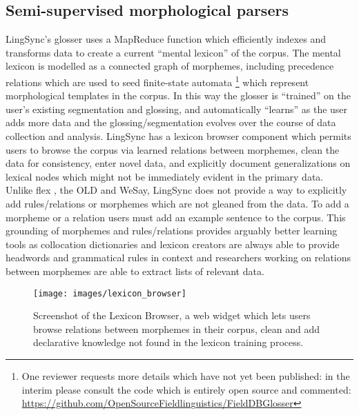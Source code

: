 \documentclass[11pt]{article}
\begin{document}
\subsection{Semi-supervised morphological parsers}
 \label{sec:lingsync-glosser} 

LingSync's glosser uses a MapReduce function which efficiently indexes and transforms data 
 to create a current ``mental lexicon'' of the corpus.  The
mental lexicon is modelled as a connected graph of morphemes, including
precedence relations which are used to seed finite-state automata \cite{Chiodo:2009}%
\footnote{One reviewer requests more details which have not yet been published:
    in the interim please consult the code which is entirely open source and
    commented:  \\
\url{https://github.com/OpenSourceFieldlinguistics/FieldDBGlosser}} %
which represent morphological templates in the corpus. In this way the glosser
is ``trained'' on the user's existing segmentation and glossing, and
automatically ``learns'' as the user adds more data and the
glossing/segmentation evolves over the course of data collection and analysis. 
LingSync has a lexicon browser component which permits users to browse the
corpus via learned  relations between morphemes, clean the data for
consistency, enter novel data, and explicitly document generalizations on
lexical nodes which might not be immediately evident in the primary data. 
Unlike \gls{flex} \cite{Black:2006}, the OLD and WeSay, LingSync does not
provide a way to explicitly add rules/relations or morphemes which are not
gleaned from the data. To add a morpheme or a relation users must add an
example sentence to the corpus. This grounding of morphemes and rules/relations
provides arguably better learning tools as collocation dictionaries and
lexicon creators are always able to provide headwords and grammatical rules in
context and researchers working on relations between morphemes are able to
extract lists of relevant data.

\begin{figure}
\begin{center}
\texttt{[image: images/lexicon\_browser]}
\caption{Screenshot of the Lexicon Browser, a web widget which lets users
browse relations between morphemes in their corpus, clean and add
declarative knowledge not found in the lexicon training process.}
\label{lexicon_browser_screenshot}
\end{center}
\end{figure}
\end{document}
